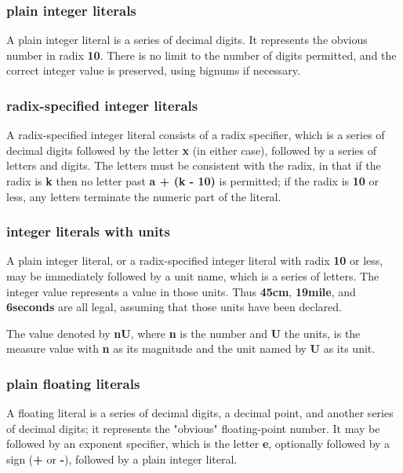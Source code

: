 \documentclass{report}
\begin{document}
\subsubsection{plain integer literals}


A plain integer literal is a series of decimal digits. It represents the
obvious number in radix {\bf 10}. There is no limit to the number of digits
permitted, and the correct integer value is preserved, using bignums if
necessary.

\subsubsection{radix-specified integer literals}


A radix-specified integer literal consists of a radix specifier, which is a
series of decimal digits followed by the letter {\bf x} (in either case), followed
by a series of letters and digits. The letters must be consistent with the
radix, in that if the radix is {\bf k} then no letter past {\bf a + (k - 10)} is
permitted; if the radix is {\bf 10} or less, any letters terminate the numeric
part of the literal.

\subsubsection{integer literals with units}


A plain integer literal, or a radix-specified integer literal with radix {\bf 10}
or less, may be immediately followed by a unit name, which is a series of
letters. The integer value represents a value in those units. Thus {\bf 45cm},
{\bf 19mile}, and {\bf 6seconds} are all legal, assuming that those units have been
declared.

The value denoted by {\bf nU}, where {\bf n} is the number and {\bf U} the units, is the
measure value with {\bf n} as its magnitude and the unit named by {\bf U} as its unit.

\subsubsection{plain floating literals}


A floating literal is a series of decimal digits, a decimal point, and another
series of decimal digits; it represents the "obvious" floating-point number.
It may be followed by an exponent specifier, which is the letter {\bf e},
optionally followed by a sign ({\bf +} or {\bf -}), followed by a plain integer
literal.
\end{document}
